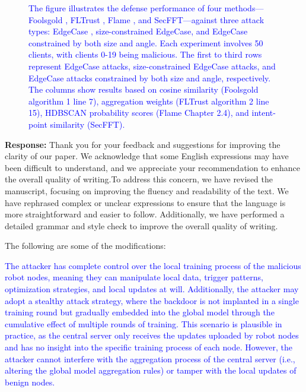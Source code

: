 \documentclass[a4paper,twoside,11pt,dvipsnames]{reviewresponse}
\begin{document}
\begin{figure*}[!t]
    \caption{\textcolor{blue}{The figure illustrates the defense performance of four methods—Foolsgold \cite{foolsgold}, FLTrust \cite{FLTrust}, Flame \cite{FLAME}, and SecFFT—against three attack types: EdgeCase \cite{EDGE_CASE}, size-constrained EdgeCase, and EdgeCase constrained by both size and angle. Each experiment involves 50 clients, with clients 0-19 being malicious. The first to third rows represent EdgeCase attacks, size-constrained EdgeCase attacks, and EdgeCase attacks constrained by both size and angle, respectively. The columns show results based on cosine similarity (Foolsgold algorithm 1 line 7), aggregation weights (FLTrust algorithm 2 line 15), HDBSCAN probability scores (Flame Chapter 2.4), and intent-point similarity (SecFFT).}}
    \label{fig:lab3}
\end{figure*}

\textbf{Response:} 
Thank you for your feedback and suggestions for improving the clarity of our paper. We acknowledge that some English expressions may have been difficult to understand, and we appreciate your recommendation to enhance the overall quality of writing.To address this concern, we have revised the manuscript, focusing on improving the fluency and readability of the text. We have rephrased complex or unclear expressions to ensure that the language is more straightforward and easier to follow. Additionally, we have performed a detailed grammar and style check to improve the overall quality of writing.

The following are some of the modifications:

\textcolor{blue}{The attacker has complete control over the local training process of the malicious robot nodes, meaning they can manipulate local data, trigger patterns, optimization strategies, and local updates at will. Additionally, the attacker may adopt a stealthy attack strategy, where the backdoor is not implanted in a single training round but gradually embedded into the global model through the cumulative effect of multiple rounds of training. This scenario is plausible in practice, as the central server only receives the updates uploaded by robot nodes and has no insight into the specific training process of each node. However, the attacker cannot interfere with the aggregation process of the central server (i.e., altering the global model aggregation rules) or tamper with the local updates of benign nodes.}
\end{document}
